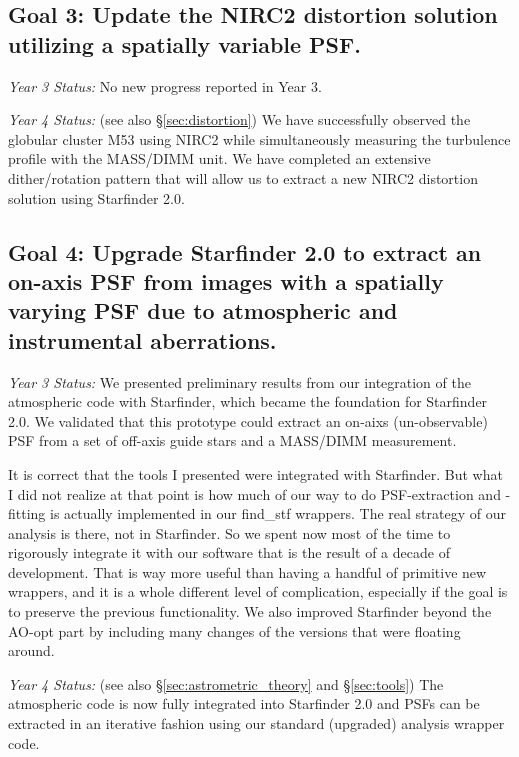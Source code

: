 \subsection{Goal 3: Update the NIRC2 distortion solution utilizing a spatially
  variable PSF.}

\noindent
\textit{Year 3 Status:}
No new progress reported in Year 3.

\noindent
\textit{Year 4 Status:} (see also \S\ref{sec:distortion})
We have successfully observed the globular cluster M53 using NIRC2
while simultaneously measuring the turbulence profile with the
MASS/DIMM unit. We have completed an extensive dither/rotation pattern
that will allow us to extract a new NIRC2 distortion solution using
Starfinder 2.0.


\subsection{Goal 4: Upgrade Starfinder 2.0 to extract an on-axis PSF from images with
  a spatially varying PSF due to atmospheric and instrumental aberrations.}

\noindent
\textit{Year 3 Status:} 
We presented preliminary results from our integration of the
atmospheric code with Starfinder, which became the foundation for
Starfinder 2.0. We validated that this prototype could extract an
on-aixs (un-observable) PSF from a set of off-axis guide stars and a
MASS/DIMM measurement. 

It is correct that the tools I presented were integrated with
Starfinder. But what I did not realize at that point is how much of
our way to do PSF-extraction and -fitting is actually implemented in
our find\_stf wrappers. The real strategy of our analysis is there,
not in Starfinder. So we spent now most of the time to rigorously
integrate it with our software that is the result of a decade of
development. That is way more useful than having a handful of
primitive new wrappers, and it is a whole different level of
complication, especially if the goal is to preserve the previous
functionality. We also improved Starfinder beyond the AO-opt part by
including many changes of the versions that were floating around. 

\noindent
\textit{Year 4 Status:}
(see also \S\ref{sec:astrometric_theory} and \S\ref{sec:tools})
The atmospheric code is now fully integrated into Starfinder 2.0 and
PSFs can be extracted in an iterative fashion using our standard
(upgraded) analysis wrapper code. 


